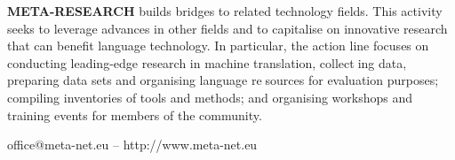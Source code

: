 \begin{multicols}{2}
\textbf{META-RESEARCH} builds bridges to related technology ﬁelds. This activity seeks to leverage advances in other ﬁelds and to capitalise on innovative research that can beneﬁt language technology. In particular, the action line focuses on conducting leading-edge research in machine translation, collecting data, preparing data sets and organising language resources for evaluation purposes; compiling inventories of tools and methods; and organising workshops and training events for members of the community.
  \end{multicols}

  \vfill
  \centerline{office@meta-net.eu -- http://www.meta-net.eu}

  \cleardoublepage

  \appendix

  

  \cleardoublepage

  \label{metanetmembers}

  \small

